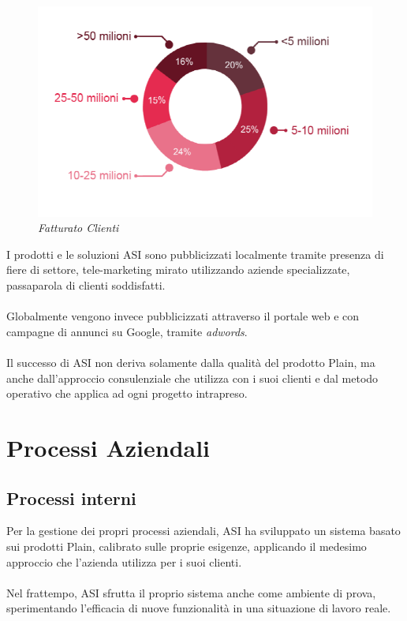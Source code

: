 \begin{figure}[ht]
	\centering
	\includegraphics[scale=0.35]{immagini/azienda/fatturato_clienti}
	\caption{\textit{Fatturato Clienti \asi}}
\end{figure}\FloatBarrier

I prodotti e le soluzioni ASI sono pubblicizzati localmente tramite presenza di fiere di settore, tele-marketing mirato utilizzando aziende specializzate, passaparola di clienti soddisfatti.
\\\\
Globalmente vengono invece pubblicizzati attraverso il portale web e con campagne di annunci su Google, tramite \textit{adwords}.
\\\\
Il successo di ASI non deriva solamente dalla qualità del prodotto Plain, ma anche dall'approccio consulenziale  che utilizza con i suoi clienti e dal metodo operativo che applica ad ogni progetto intrapreso.
\section{Processi Aziendali}
\subsection{Processi interni}
Per la gestione dei propri processi aziendali, ASI ha sviluppato un sistema basato sui prodotti Plain, calibrato sulle proprie esigenze, applicando il medesimo approccio che l'azienda utilizza per i suoi clienti.
\\\\
Nel frattempo, ASI sfrutta il proprio sistema anche come ambiente di prova, sperimentando l'efficacia di nuove funzionalità in una situazione di lavoro reale.
